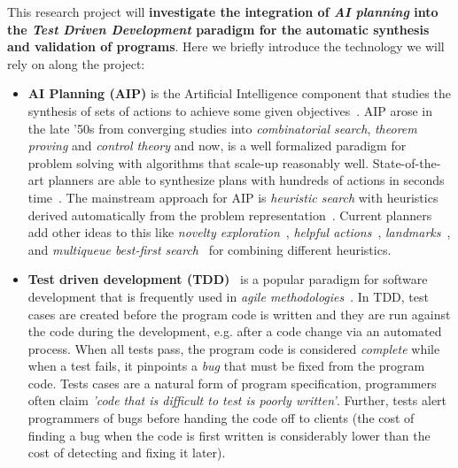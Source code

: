 \documentclass[10pt,a4paper]{paper}
\begin{document}
This research project will {\bf investigate the integration of {\em AI planning} into the {\em Test Driven Development} paradigm for the automatic synthesis and validation of programs}. Here we briefly introduce the technology we will rely on along the project:
\begin{itemize}
\item {\bf AI Planning (AIP)} is the Artificial Intelligence component that studies the synthesis of sets of actions to achieve some given objectives~\cite{ghallab2004automated}. AIP arose in the late ’50s from converging studies into {\em combinatorial search}, {\em theorem proving} and {\em control theory} and now, is a well formalized paradigm for problem solving with algorithms that scale-up reasonably well. State-of-the-art planners are able to synthesize plans with hundreds of actions in seconds time~\cite{geffner2013concise}.  The mainstream approach for AIP is {\em heuristic search} with heuristics derived automatically from the problem representation~\cite{mcdermott1996heuristic,bonet2001planning}.  Current planners add other ideas to this like {\it novelty exploration}~\cite{geffner:psimulators:IJCAI17}, {\it helpful actions}~\cite{hoffmann2001ff}, {\it landmarks}~\cite{helmert2006fast}, and {\it multiqueue best-first search}~\cite{richter2010lama} for combining different heuristics.
  
\item {\bf Test driven development (TDD)}~\cite{beck:TDD:2003} is a popular paradigm for software development that is frequently used in {\it agile methodologies}~\cite{cohen2003agile}. In TDD, test cases are created before the program code is written and they are run against the code during the development, e.g. after a code change via an automated process. When all tests pass, the program code is considered {\em complete} while when a test fails, it pinpoints a {\em bug} that must be fixed from the program code. Tests cases are a natural form of program specification, programmers often claim {\em 'code that is difficult to test is poorly written'}. Further, tests alert programmers of bugs before handing the code off to clients (the cost of finding a bug when the code is first written is considerably lower than the cost of detecting and fixing it later). %
\end{itemize}
\end{document}
